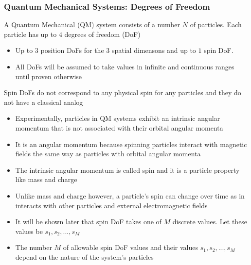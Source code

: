 \documentclass[8pt,t,mathserif,aspectratio=169]{beamer}
\begin{document}
\begin{frame}
  \frametitle{Quantum Mechanical Systems: Degrees of Freedom}
  \vspace{1mm}
  A Quantum Mechanical (QM) system consists of a number $N$ of particles. Each particle has up to $4$ degrees of freedom (DoF)
  \begin{itemize}
    \item Up to $3$ position DoFs for the $3$ spatial dimensons and up to $1$ spin DoF.
    \item All DoFs will be assumed to take values in infinite and continuous ranges until proven otherwise
  \end{itemize}
  Spin DoFs do not correspond to any physical spin for any particles and they do not have a classical analog
  \begin{itemize}
    \item Experimentally, particles in QM systems exhibit an intrinsic angular momentum that is not associated with their orbital angular momenta
    \item It is an angular momentum because spinning particles interact with magnetic fields the same way as particles with orbital angular momenta 
    \item The intrinsic angular momentum is called spin and it is a particle property like mass and charge
    \item Unlike mass and charge however, a particle's spin can change over time as in interacts with other particles and external electromagnetic fields
    \item It will be shown later that spin DoF takes one of $M$ discrete values. Let these values be $s_1,s_2,...,s_M$
    \item The number $M$ of allowable spin DoF values and their values $s_1,s_2,...,s_M$ depend on the nature of the system's particles
  \end{itemize}
\end{frame}
\end{document}
